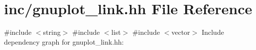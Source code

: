 \hypertarget{gnuplot__link_8hh}{}\section{inc/gnuplot\+\_\+link.hh File Reference}
\label{gnuplot__link_8hh}
{\ttfamily \#include $<$string$>$}\newline
{\ttfamily \#include $<$list$>$}\newline
{\ttfamily \#include $<$vector$>$}\newline
Include dependency graph for gnuplot\+\_\+link.\+hh\+:
